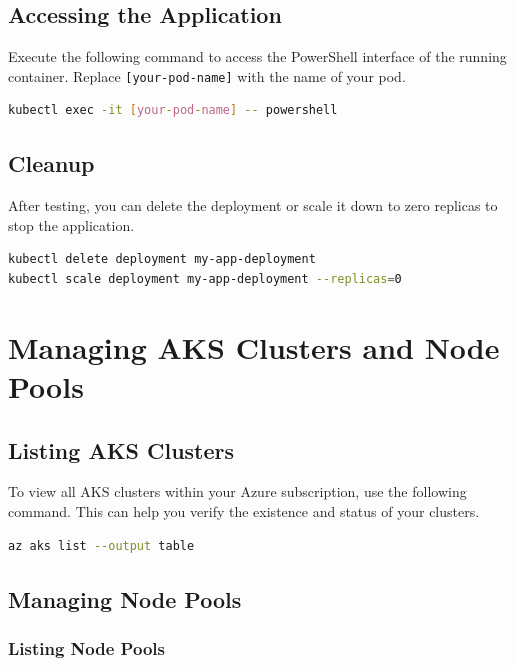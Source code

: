 \documentclass{article}
\begin{document}
\subsection{Accessing the Application}

Execute the following command to access the PowerShell interface of the running container. Replace \texttt{[your-pod-name]} with the name of your pod.

\begin{lstlisting}[language=bash]
kubectl exec -it [your-pod-name] -- powershell
\end{lstlisting}


\subsection{Cleanup}

After testing, you can delete the deployment or scale it down to zero replicas to stop the application.

\begin{lstlisting}[language=bash]
kubectl delete deployment my-app-deployment
kubectl scale deployment my-app-deployment --replicas=0
\end{lstlisting}


\section{Managing AKS Clusters and Node Pools}  

\subsection{Listing AKS Clusters}

To view all AKS clusters within your Azure subscription, use the following command. This can help you verify the existence and status of your clusters.

\begin{lstlisting}[language=bash]
az aks list --output table
\end{lstlisting}

\subsection{Managing Node Pools}

\subsubsection{Listing Node Pools}
\end{document}
